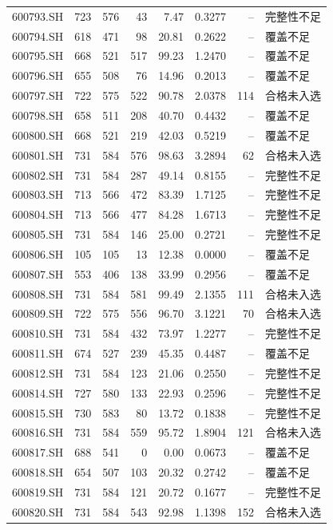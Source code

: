 \documentclass[10pt,a4paper]{article}
\begin{document}
\begin{longtable}{lrrr r r r l}
600793.SH & 723 & 576 & 43 & 7.47 & 0.3277 & -- & 完整性不足\\
600794.SH & 618 & 471 & 98 & 20.81 & 0.2622 & -- & 覆盖不足\\
600795.SH & 668 & 521 & 517 & 99.23 & 1.2470 & -- & 覆盖不足\\
600796.SH & 655 & 508 & 76 & 14.96 & 0.2013 & -- & 覆盖不足\\
600797.SH & 722 & 575 & 522 & 90.78 & 2.0378 & 114 & 合格未入选\\
600798.SH & 658 & 511 & 208 & 40.70 & 0.4432 & -- & 覆盖不足\\
600800.SH & 668 & 521 & 219 & 42.03 & 0.5219 & -- & 覆盖不足\\
600801.SH & 731 & 584 & 576 & 98.63 & 3.2894 & 62 & 合格未入选\\
600802.SH & 731 & 584 & 287 & 49.14 & 0.8155 & -- & 完整性不足\\
600803.SH & 713 & 566 & 472 & 83.39 & 1.7125 & -- & 完整性不足\\
600804.SH & 713 & 566 & 477 & 84.28 & 1.6713 & -- & 完整性不足\\
600805.SH & 731 & 584 & 146 & 25.00 & 0.2721 & -- & 完整性不足\\
600806.SH & 105 & 105 & 13 & 12.38 & 0.0000 & -- & 覆盖不足\\
600807.SH & 553 & 406 & 138 & 33.99 & 0.2956 & -- & 覆盖不足\\
600808.SH & 731 & 584 & 581 & 99.49 & 2.1355 & 111 & 合格未入选\\
600809.SH & 722 & 575 & 556 & 96.70 & 3.1221 & 70 & 合格未入选\\
600810.SH & 731 & 584 & 432 & 73.97 & 1.2277 & -- & 完整性不足\\
600811.SH & 674 & 527 & 239 & 45.35 & 0.4487 & -- & 覆盖不足\\
600812.SH & 731 & 584 & 123 & 21.06 & 0.2550 & -- & 完整性不足\\
600814.SH & 727 & 580 & 133 & 22.93 & 0.2596 & -- & 完整性不足\\
600815.SH & 730 & 583 & 80 & 13.72 & 0.1838 & -- & 完整性不足\\
600816.SH & 731 & 584 & 559 & 95.72 & 1.8904 & 121 & 合格未入选\\
600817.SH & 688 & 541 & 0 & 0.00 & 0.0673 & -- & 覆盖不足\\
600818.SH & 654 & 507 & 103 & 20.32 & 0.2742 & -- & 覆盖不足\\
600819.SH & 731 & 584 & 121 & 20.72 & 0.1677 & -- & 完整性不足\\
600820.SH & 731 & 584 & 543 & 92.98 & 1.1398 & 152 & 合格未入选\\

\end{longtable}
\end{document}
